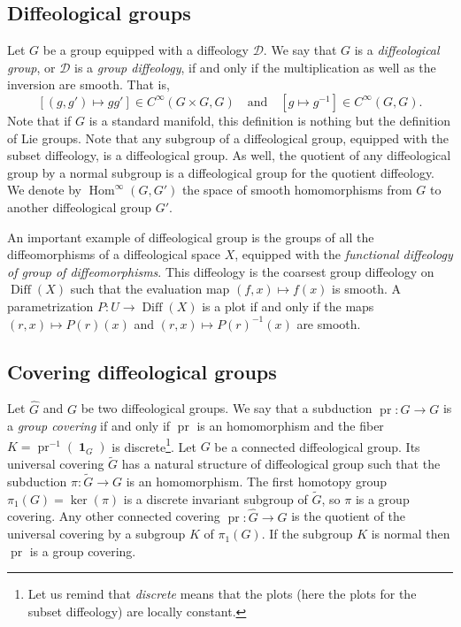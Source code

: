 \documentclass[10pt,reqno,twoside]{amsart}
\newcommand{\cD}{\mathcal{D}}
\DeclareMathOperator{\id}{\mathbf{1}}
\DeclareMathOperator{\pr}{pr}
\DeclareMathOperator{\Diff}{Diff}
\DeclareMathOperator{\Hom}{Hom}
\newcommand{\Cinfty}{C^\infty}
\theoremstyle{plain}
\theoremstyle{definition}
\newcommand{\article}[1]{\subsection{#1}}
\begin{document}
  \article{Diffeological groups}
  \label{Diffeological-groups}
  Let $G$ be a group equipped with a diffeology $\cD$.
  We say that $G$ is a {\em diffeological group},
  or $\cD$ is a {\em group diffeology},
  if and only if the multiplication as well as the inversion are smooth.
  That is,
  $$
[(g,g')\mapsto gg'] \in \Cinfty(G\times G,G) \quad \mbox{and}
\quad [g\mapsto g^{-1}] \in \Cinfty(G, G).
    $$
  Note that if $G$ is a standard manifold,
  this definition is nothing but the definition of Lie groups.
  Note that any subgroup of a diffeological group,
  equipped with the subset diffeology,
  is a diffeological group.
  As well,
  the quotient of any diffeological group by a normal subgroup is a diffeological group for the quotient diffeology.
  We denote by $\Hom^\infty(G,G')$ the space of smooth homomorphisms from $G$ to another diffeological group $G'$.
  
  An important example of diffeological group is the groups of all the diffeomorphisms of a diffeological space $X$,
  equipped with the {\em functional diffeology of group of diffeomorphisms}.
  This diffeology is the coarsest group diffeology on $\Diff(X)$ such that the evaluation map $(f,x) \mapsto f(x)$ is smooth.
  A parametrization $P : U \to \Diff(X)$ is a plot if and only if the maps $(r,x) \mapsto P (r)(x)$ and $(r,x) \mapsto P (r)^{-1}(x)$ are smooth.
  
  \article{Covering diffeological groups}
  \label{Covering-diffeological-groups}
  Let $\hat G$ and $G$ be two diffeological groups.
  We say that a subduction $\pr : \hat G \to G$ is a {\em group covering} if and only if $\pr$ is an homomorphism and the fiber $K = \pr^{-1}(\id_G)$ is discrete\footnote{Let us remind that {\em discrete} means that the plots (here the plots for the subset diffeology) are locally constant.}.
  Let $G$ be a connected diffeological group.
  Its universal covering $\tilde G$ has a natural structure of diffeological group such that the subduction $\pi : \tilde G \to G$ is an homomorphism.
  The first homotopy group $\pi_1(G) = \ker(\pi)$ is a discrete invariant subgroup of $\tilde G$,
  so $\pi$ is a group covering.
  Any other connected covering $\pr : \hat G \to G$ is the quotient of the universal covering by a subgroup $K$ of $\pi_1(G)$.
  If the subgroup $K$ is normal then $\pr$ is a group covering.
  
\end{document}
